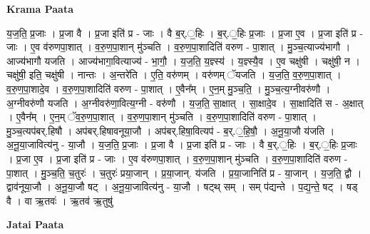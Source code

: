 \documentclass[17pt]{extarticle}
\begin{document}
\textbf{Krama Paata} \newline

य॒ज॒ति॒ प्र॒जाः । प्र॒जा वै । प्र॒जा इति॑ प्र - जाः । वै ब॒र्.॒हिः । ब॒र्.॒हिः प्र॒जाः । प्र॒जा ए॒व । प्र॒जा इति॑ प्र - जाः । ए॒व व॑रुणपा॒शात् । व॒रु॒ण॒पा॒शान् मु॑ञ्चति । व॒रु॒ण॒पा॒शादिति॑ वरुण - पा॒शात् । मु॒ञ्च॒त्याज्य॑भागौ । आज्य॑भागौ यजति । आज्य॑भागा॒वित्याज्य॑ - भा॒गौ॒ । य॒ज॒ति॒ य॒ज्ञ्स्य॑ । य॒ज्ञ्स्यै॒व । ए॒व चक्षु॑षी । चक्षु॑षी॒ न । चक्षु॑षी॒ इति॒ चक्षु॑षी । नान्तः । अ॒न्तरे॑ति । ए॒ति॒ वरु॑णम् । वरु॑णम् ॅयजति । य॒ज॒ति॒ व॒रु॒ण॒पा॒शात् । व॒रु॒ण॒पा॒शादे॒व । व॒रु॒ण॒पा॒शादिति॑ वरुण - पा॒शात् । ए॒वैन᳚म् । ए॒न॒म् मु॒ञ्च॒ति॒ । मु॒ञ्च॒त्य॒ग्नीवरु॑णौ । अ॒ग्नीवरु॑णौ यजति । अ॒ग्नीवरु॑णा॒वित्य॒ग्नी - वरु॑णौ । य॒ज॒ति॒ सा॒क्षात् । सा॒क्षादे॒व । सा॒क्षादिति॑ स - अ॒क्षात् । ए॒वैन᳚म् । ए॒न॒म् ॅव॒रु॒ण॒पा॒शात् । व॒रु॒ण॒पा॒शान् मु॑ञ्चति । व॒रु॒ण॒पा॒शादिति॑ वरुण - पा॒शात् । मु॒ञ्च॒त्यप॑बर्.हिषौ । अप॑बर्.हिषावनूया॒जौ । अप॑बर्.हिषा॒वित्यप॑ - ब॒र्.॒हि॒षौ॒ । अ॒नू॒या॒जौ य॑जति । अ॒नू॒या॒जावित्य॑नु - या॒जौ । य॒ज॒ति॒ प्र॒जाः । प्र॒जा वै । प्र॒जा इति॑ प्र - जाः । वै ब॒र्.॒हिः । ब॒र्.॒हिः प्र॒जाः । प्र॒जा ए॒व । प्र॒जा इति॑ प्र - जाः । ए॒व व॑रुणपा॒शात् । व॒रु॒ण॒पा॒शान् मु॑ञ्चति । व॒रु॒ण॒पा॒शादिति॑ वरुण - पा॒शात् । मु॒ञ्च॒ति॒ च॒तुरः॑ । च॒तुरः॑ प्रया॒जान् । प्र॒या॒जान्. य॑जति । प्र॒या॒जानिति॑ प्र - या॒जान् । य॒ज॒ति॒ द्वौ । द्वाव॑नूया॒जौ । अ॒नू॒या॒जौ षट् । अ॒नू॒या॒जावित्य॑नु - या॒जौ । षट्थ् सम् । सम् प॑द्यन्ते । प॒द्य॒न्ते॒ षट् । षड् वै । वा ऋ॒तवः॑ । ऋ॒तव॑ ऋ॒तुषु॑ \newline

\textbf{Jatai Paata} \newline
\end{document}
